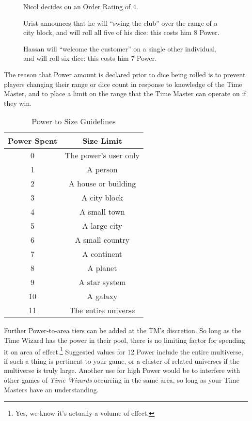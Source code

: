 \documentclass[twoside]{article}
\newcommand{\tw}{\emph{Time Wizards}}
\newenvironment{examplebox}[1]{\begin{tcolorbox}[colback=green!5!white,colframe=green!75!black,title={Example: #1}]}{\end{tcolorbox}\vspace{-30pt}}
\begin{document}
\begin{wrapfigure}{o}{0.5\textwidth}
   \begin{examplebox}{Declaring Powers}
      Nicol decides on an Order Rating of 4.

      Urist announces that he will ``swing the club'' over the range of a city block, and will
      roll all five of his dice: this costs him 8 Power.

      Hassan will ``welcome the customer'' on a single other individual, and will roll six dice:
      this costs him 7 Power.
   \end{examplebox}
   \vspace{25pt}
\end{wrapfigure}

The reason that Power amount is declared prior to dice being rolled is to prevent players
changing their range or dice count in response to knowledge of the Time Master, and to place a
limit on the range that the Time Master can operate on if they win.

\begin{wraptable}{o}{0.5\textwidth}
   \caption{Power to Size Guidelines}
   \label{tab:powersize}

   \begin{tabular}{c|c}
      \textbf{Power Spent} & {Size Limit}\\ \hline
      0 & The power's user only\\
      1 & A person\\
      2 & A house or building\\
      3 & A city block\\
      4 & A small town\\
      5 & A large city\\
      6 & A small country\\
      7 & A continent\\
      8 & A planet\\
      9 & A star system\\
      10 & A galaxy\\
      11 & The entire universe
   \end{tabular}
   \vspace{-24pt}
\end{wraptable}

Further Power-to-area tiers can be added at the TM's discretion. So long as the Time Wizard has
the power in their pool, there is no limiting factor for spending it on area of
effect.\footnote{Yes, we know it's actually a volume of effect.} Suggested values for 12 Power
include the entire multiverse, if such a thing is pertinent to your game, or a cluster of
related universes if the multiverse is truly large. Another use for high Power would be to
interfere with other games of \tw{} occurring in the same area, so long as your Time Masters
have an understanding.
\end{document}
